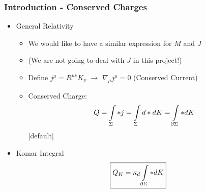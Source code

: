\documentclass[t]{beamer}
\begin{document}
\begin{frame}
\frametitle{Introduction - Conserved Charges}

\begin{itemize}
\setlength{\parskip}{10pt}
\item General Relativity

\begin{itemize}
[triangle]
\setlength{\parskip}{10pt}

\item<1-> We would like to have a similar expression for $M$ and $J$
\item<2-> (We are not going to deal with $J$ in this project!) 
\item<3-> Define $j^\mu = R^{\mu\nu} K_\nu $ $\rightarrow$ \:\:\: $\nabla_\mu j^\mu = 0$ (Conserved Current)
\item<4-> Conserved Charge:
\begin{align}
Q = \int\limits_{\Sigma} *j = \int\limits_{\Sigma} d*dK = \int\limits_{\partial\Sigma} *dK \notag
\end{align}
[default]
\end{itemize}

\item<5-> Komar Integral
\begin{align}
\boxed{Q_{K} = \kappa_{d} \int\limits_{\partial\Sigma} *dK} \notag
\end{align}

\end{itemize}
\end{frame}

\end{document}
